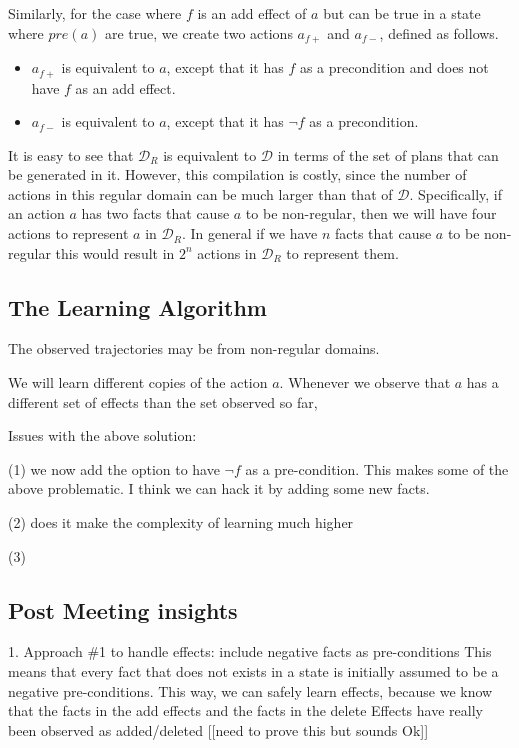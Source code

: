 Similarly, for the case where $f$ is an add effect of $a$ but can be true in a state where $pre(a)$ are true, we create two actions $a_{f+}$ and $a_{f-}$, defined as follows. 

\begin{itemize}
	\item $a_{f+}$ is equivalent to $a$, except that it has $f$ as a precondition and does not have $f$ as an add effect.
	\item $a_{f-}$ is equivalent to $a$, except that it has $\neg f$ as a precondition.
\end{itemize}

It is easy to see that $\mathcal{D}_R$ is equivalent to $\mathcal{D}$ in terms of the set of plans that can be generated in it. However, this compilation is costly, since the number of actions in this regular domain can be much larger than that of $\mathcal{D}$. Specifically, if an action $a$ has two facts that cause $a$ to be non-regular, then we will have four actions to represent $a$ in $\mathcal{D}_R$. In general if we have $n$ facts that cause $a$ to be non-regular this would result in $2^n$ actions in $\mathcal{D}_R$ to represent them.




\subsection{The Learning Algorithm}
The observed trajectories may be from non-regular domains. 

We will learn different copies of the action $a$. 
Whenever we observe that $a$ has a different set of effects
than the set observed so far, 


Issues with the above solution: 

(1) we now add the option to have $\neg f$ as a pre-condition. This makes some of the above problematic. I think we can hack it by adding some new facts. 

(2) does it make the complexity of learning much higher

(3) 

\subsection{Post Meeting insights}

1. Approach \#1 to handle effects: include negative facts as pre-conditions
This means that every fact that does not exists in a state 
is initially assumed to be a negative pre-conditions. 
This way, we can safely learn effects, because we know that 
the facts in the add effects and the facts in the delete Effects
have  really been observed as added/deleted [[need to prove this but sounds Ok]]

